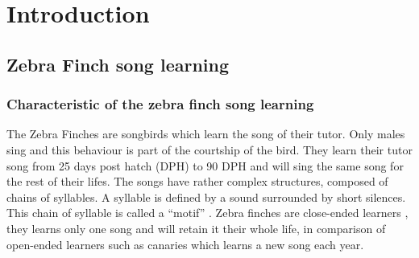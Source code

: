 \documentclass{report}
\begin{document}
\tableofcontents

\chapter{Introduction}\label{introduction}

\section{Zebra Finch song learning}\label{zebra-finch-song-learning}

\subsection{Characteristic of the zebra finch song
learning}\label{characteristic-of-zebra-finch-song-learning}


The Zebra Finches are songbirds which learn the song of their tutor. Only males
sing and this behaviour is part of the courtship of the bird. They learn their
tutor song from 25 days post hatch (DPH) to 90 DPH \parencite{liu_juvenile_2004}
and will sing the same song for the rest of their lifes. The songs have rather
complex structures, composed of chains of syllables. A syllable is defined by a
sound surrounded by short silences. This chain of syllable is called a ``motif''
\parencite{doupe_birdsong_1999, margoliash_evaluating_2002}. Zebra finches are
close-ended learners \parencite{margoliash_sleep_2010}, they learns only one
song and will retain it their whole life, in comparison of open-ended learners
such as canaries which learns a new song each year.
\end{document}
